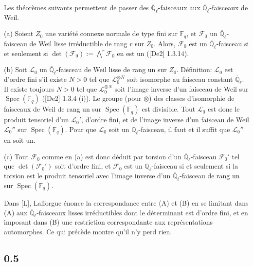 \documentclass[11pt,a4paper]{article}
\theoremstyle{plain}
\theoremstyle{definition}
\DeclareMathOperator{\Spec}{Spec}
\begin{document}
Les th\'eor\`emes suivants permettent de passer des $\overline{\mathbb{Q}}_\ell$-faisceaux aux $\overline{\mathbb{Q}}_\ell$-faisceaux de Weil.

(a) Soient $Z_0$ une vari\'et\'e connexe normale de type fini sur $\mathbb{F}_q$, et $\mathcal{F}_0$ un $\overline{\mathbb{Q}}_\ell$-faisceau de Weil lisse irr\'eductible de rang $r$ sur $Z_0$. Alors, $\mathcal{F}_0$ est un $\overline{\mathbb{Q}}_\ell$-faisceau si et seulement si $\det(\mathcal{F}_0) := \bigwedge^r \mathcal{F}_0$ en est un ([De2] 1.3.14).

(b) Soit $\mathcal{L}_0$ un $\overline{\mathbb{Q}}_\ell$-faisceau de Weil lisse de rang un sur $Z_0$. D\'efinition: $\mathcal{L}_0$ est d'ordre fini s'il existe $N > 0$ tel que $\mathcal{L}_0^{\otimes N}$ soit isomorphe au faisceau constant $\overline{\mathbb{Q}}_\ell$. Il existe toujours $N > 0$ tel que $\mathcal{L}_0^{\otimes N}$ soit l'image inverse d'un faisceau de Weil sur $\Spec(\mathbb{F}_q)$ ([De2] 1.3.4 (i)). Le groupe (pour $\otimes$) des classes d'isomorphie de faisceaux de Weil de rang un sur $\Spec(\mathbb{F}_q)$ est divisible. Tout $\mathcal{L}_0$ est donc le produit tensoriel d'un $\mathcal{L}_0'$, d'ordre fini, et de l'image inverse d'un faisceau de Weil $\mathcal{L}_0''$ sur $\Spec(\mathbb{F}_q)$. Pour que $\mathcal{L}_0$ soit un $\overline{\mathbb{Q}}_\ell$-faisceau, il faut et il suffit que $\mathcal{L}_0''$ en soit un.

(c) Tout $\mathcal{F}_0$ comme en (a) est donc d\'eduit par torsion d'un $\overline{\mathbb{Q}}_\ell$-faisceau $\mathcal{F}_0'$ tel que $\det(\mathcal{F}_0')$ soit d'ordre fini, et $\mathcal{F}_0$ est un $\overline{\mathbb{Q}}_\ell$-faisceau si et seulement si la torsion est le produit tensoriel avec l'image inverse d'un $\overline{\mathbb{Q}}_\ell$-faisceau de rang un sur $\Spec(\mathbb{F}_q)$.

Dans [L], Lafforgue \'enonce la correspondance entre (A) et (B) en se limitant dans (A) aux $\overline{\mathbb{Q}}_\ell$-faisceaux lisses irr\'eductibles dont le d\'eterminant est d'ordre fini, et en imposant dans (B) une restriction correspondante aux repr\'esentations automorphes. Ce qui pr\'ec\`ede montre qu'il n'y perd rien.

\subsection*{0.5}
\end{document}

